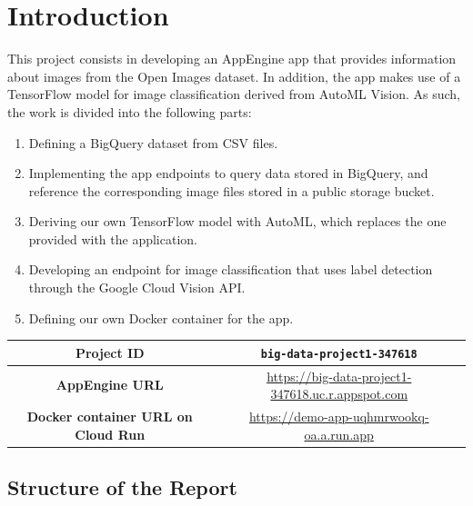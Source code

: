 \documentclass[a4paper, 11pt]{article}
\begin{document}
\pagebreak

\tableofcontents
\listoffigures 
\lstlistoflistings

\pagebreak


\section{Introduction}

This project consists in developing an AppEngine app that provides information about images from 
the Open Images dataset. In addition, the app makes use of a TensorFlow model for image 
classification derived from AutoML Vision. As such, the work is divided into the following parts:

\begin{enumerate}
    \item Defining a BigQuery dataset from CSV files.
    \item Implementing the app endpoints to query data stored in BigQuery, and reference the 
    corresponding image files stored in a public storage bucket.
    \item Deriving our own TensorFlow model with AutoML, which replaces the one provided with the 
    application.
    \item Developing an endpoint for image classification that uses label detection through the 
    Google Cloud Vision API.
    \item Defining our own Docker container for the app.
\end{enumerate}

\begin{table}[H]
\centering
\begin{tabular}{|c|c|}
\hline
\textbf{Project ID}     & \texttt{big-data-project1-347618} \\ \hline
\textbf{AppEngine URL} & \url{https://big-data-project1-347618.uc.r.appspot.com} \\ \hline
\textbf{Docker container URL on Cloud Run}   & \url{https://demo-app-uqhmrwookq-oa.a.run.app} \\ \hline
\end{tabular}
\end{table}

\vspace{\baselineskip}

\subsection*{Structure of the Report}
\end{document}
